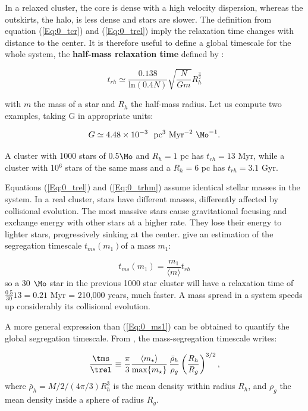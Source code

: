 In a relaxed cluster, the core is dense with a high velocity dispersion, whereas the outskirts, the halo, is less dense and stars are slower. The definition from equation (\ref{Eq:0_tcr}) and (\ref{Eq:0_trel}) imply the relaxation time changes with distance to the center. It is therefore useful to define a global timescale for the whole system, the \textbf{half-mass relaxation time} defined by \cite{Heggie2003}:


\begin{equation}
\label{Eq:0_trhm}
t_{rh} \simeq   \frac{0.138}{\textrm{ln}(0.4 N)} \sqrt{ \frac{N}{G m}} R_h^\frac{3}{2}
\end{equation}

with $m$ the mass of a star and $R_h$ the half-mass radius. Let us compute two examples, taking G in appropriate units:

\begin{equation}
G \simeq 4.48 \times 10^{-3}~~ \textrm{pc}^3 ~\textrm{Myr}^{-2} ~\Mo^{-1}.
\end{equation}

A cluster with 1000 stars of 0.5$\Mo$ and $R_{h} = 1$ pc has $t_{rh} = 13$ Myr, while a cluster with 10$^6$ stars of the same mass and a $R_{h} = 6$ pc has $t_{rh} = 3.1$ Gyr.


Equations (\ref{Eq:0_trel}) and (\ref{Eq:0_trhm}) assume identical stellar masses in the system. In a real cluster, stars have different masses, differently affected by collisional evolution. The most massive stars cause gravitational focusing and exchange energy with other stars at a higher rate. They lose their energy to lighter stars, progressively sinking at the center. \cite{Heggie2003} give an estimation of the segregation timescale $t_{ms}(m_1)$of a mass $m_1$:

\begin{equation}
\label{Eq:0_ms1}
t_{ms}(m_1) = \frac{m_1}{\langle m \rangle} t_{rh}
\end{equation} 
so a 30 $\Mo$ star in the previous 1000 star cluster will have a relaxation time of $\frac{0.5}{30} 13 = 0.21$ Myr = 210,000 years, much faster. A mass spread in a system speeds up considerably its collisional evolution.

A more general expression than (\ref{Eq:0_ms1}) can be obtained to quantify the global segregation timescale. From \cite{Fleck2006}, the mass-segregation timescale writes:

\begin{equation}
\label{Eq:0_ms2} 
  \frac{\tms}{\trel} \equiv \frac{\pi}{3} \frac{\langle m_\star\rangle}{\max\{m_\star\}} \, \frac{\bar{\rho}_h}{\rho_g} \left( \frac{R_h}{R_g}\right)^{3/2} ,
\end{equation}
where $\bar{\rho}_h = M/2 /( 4\pi/3) R_h^3$ is the mean density within radius $R_h$, and $\rho_g$ the mean density inside a sphere of radius $R_g$.



